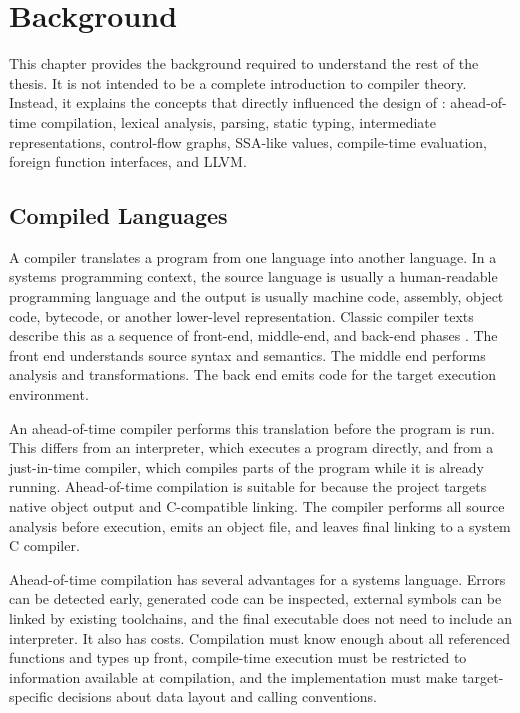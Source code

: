 \chapter{Background}
\label{chap:background}

This chapter provides the background required to understand the rest of the
thesis. It is not intended to be a complete introduction to compiler theory.
Instead, it explains the concepts that directly influenced the design of \epl:
ahead-of-time compilation, lexical analysis, parsing, static typing, intermediate
representations, control-flow graphs, SSA-like values, compile-time evaluation,
foreign function interfaces, and LLVM.

\section{Compiled Languages}

A compiler translates a program from one language into another language. In a
systems programming context, the source language is usually a human-readable
programming language and the output is usually machine code, assembly, object
code, bytecode, or another lower-level representation. Classic compiler texts
describe this as a sequence of front-end, middle-end, and back-end phases
\cite{aho2006compilers,cooper2011engineering}. The front end understands source
syntax and semantics. The middle end performs analysis and transformations. The
back end emits code for the target execution environment.

An ahead-of-time compiler performs this translation before the program is run.
This differs from an interpreter, which executes a program directly, and from a
just-in-time compiler, which compiles parts of the program while it is already
running. Ahead-of-time compilation is suitable for \epl{} because the project
targets native object output and C-compatible linking. The compiler performs all
source analysis before execution, emits an object file, and leaves final linking
to a system C compiler.

Ahead-of-time compilation has several advantages for a systems language. Errors
can be detected early, generated code can be inspected, external symbols can be
linked by existing toolchains, and the final executable does not need to include
an interpreter. It also has costs. Compilation must know enough about all
referenced functions and types up front, compile-time execution must be
restricted to information available at compilation, and the implementation must
make target-specific decisions about data layout and calling conventions.

